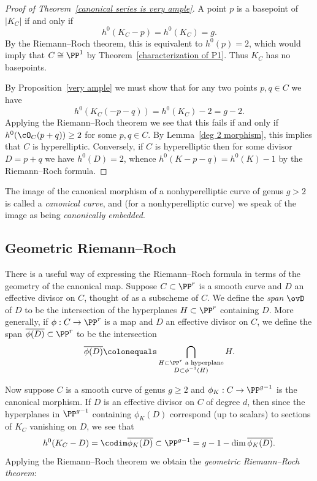 \begin{proof}[Proof of Theorem~\ref{canonical series is very ample}]
A point $p$ is a basepoint of $|K_C|$ if and only if 
$$h^0(K_C-p) = h^0(K_C) = g.$$ 
By the Riemann--Roch theorem,
this is equivalent to $h^0(p) =2$, which would imply that $C\cong \PP^1$ by Theorem~\ref{characterization of P1}. Thus $K_C$
has no basepoints.

By Proposition~\ref{very ample} we 
must
show that for any 
two
points $p, q \in C$ we have
$$
h^0(K_C(-p-q)) = h^0(K_C)-2 = g-2.
$$
Applying the Riemann--Roch theorem we see 
that this fails if and only if $h^0(\cO_C(p+q)) \geq 2$ for some $p,q
\in C$. By Lemma~\ref{deg 2 morphism}, this implies that $C$ is
hyperelliptic. Conversely, if $C$ is hyperelliptic then for some
divisor $D = p+q$ we have $h^0(D) = 2$, whence $h^0(K-p-q) = h^0(K)
-1$ by 
the Riemann--Roch formula.
\end{proof}

The image of the canonical morphism of a nonhyperelliptic curve of
genus $g>2$ is called a 
\emph{canonical curve},
%
and (for a nonhyperelliptic curve) we  
speak of the image as being \emph{canonically embedded}.


\subsection*{Geometric Riemann--Roch}

There is a useful way of expressing the Riemann--Roch formula in terms
of the geometry of the canonical map. Suppose $C \subset \PP^r$ is a
smooth curve and $D$ an effective divisor on $C$, thought of as a
subscheme of $C$. We define the 
\emph{span}
%
$\ovD$ of $D$ to be the
intersection of the hyperplanes $H \subset \PP^r$ containing $D$. More
generally, if $\phi : C \to \PP^r$ is a map and $D$ an effective
divisor on $C$, we define the span $\overline{\phi(D)} \subset \PP^r$
to be the intersection 
$$
\overline{\phi(D)} \colonequals \bigcap_{ 
\substack{H \subset \PP^r \text{ a hyperplane} \\D \subset
  \phi^{-1}(H)}}
H.
$$

Now suppose $C$ is a smooth curve of genus $g\geq 2$ and $\phi_K: C\to \PP^{g-1}$ is the canonical morphism.
If  $D$ is an effective divisor on $C$ of degree $d$, then since the hyperplanes in $\PP^{g-1}$ containing $\phi_K(D)$ correspond (up to scalars) to sections of $K_C$ vanishing on $D$, we see that
$$
h^0(K_C-D) = \codim \overline{ \phi_K(D)} \subset \PP^{g-1}= g - 1 - \dim \overline{ \phi_K(D)}.
$$
%
%
Applying the Riemann--Roch theorem we obtain  the \emph{geometric Riemann--Roch theorem}:

